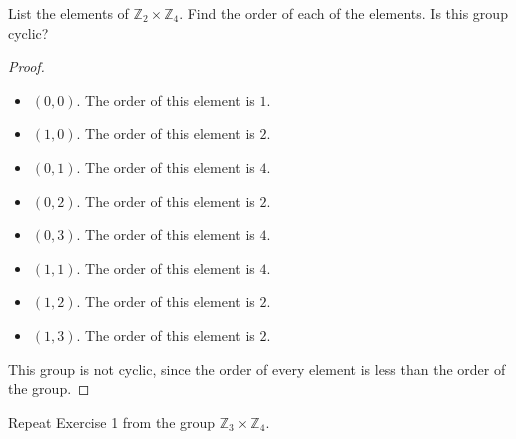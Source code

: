 \newpage
\begin{exercise}
    List the elements of $\mathbb{Z}_{2}\times\mathbb{Z}_{4}$. Find the order of each of the elements. Is this group cyclic?
\end{exercise}

\begin{proof}
    \begin{itemize}
        \item $(0, 0)$. The order of this element is $1$.
        \item $(1, 0)$. The order of this element is $2$.
        \item $(0, 1)$. The order of this element is $4$.
        \item $(0, 2)$. The order of this element is $2$.
        \item $(0, 3)$. The order of this element is $4$.
        \item $(1, 1)$. The order of this element is $4$.
        \item $(1, 2)$. The order of this element is $2$.
        \item $(1, 3)$. The order of this element is $2$.
    \end{itemize}

    This group is not cyclic, since the order of every element is less than the order of the group.
\end{proof}

\newpage
\begin{exercise}
    Repeat Exercise 1 from the group $\mathbb{Z}_{3}\times\mathbb{Z}_{4}$.
\end{exercise}

